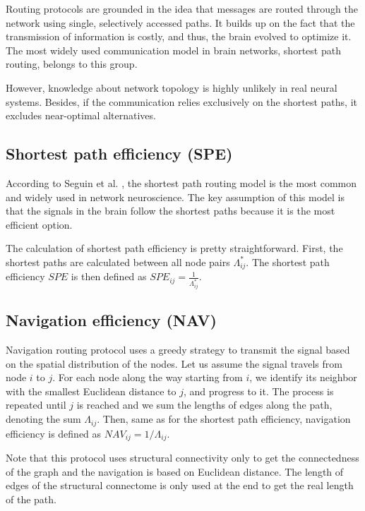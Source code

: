 Routing protocols are grounded in the idea that messages are routed through the network using single, selectively accessed paths. It builds up on the fact that the transmission of information is costly, and thus, the brain evolved to optimize it. The most widely used communication model in brain networks, shortest path routing, belongs to this group. \cite{seguin_brain_2023}

However, knowledge about network topology is highly unlikely in real neural systems. Besides, if the communication relies exclusively on the shortest paths, it excludes near-optimal alternatives. \cite{avena-koenigsberger_communication_2018}

\subsection{Shortest path efficiency (SPE)}

According to Seguin et al. \cite{seguin_brain_2023}, the shortest path routing model is the most common and widely used in network neuroscience. The key assumption of this model is that the signals in the brain follow the shortest paths because it is the most efficient option.

The calculation of shortest path efficiency is pretty straightforward. First, the shortest paths are calculated between all node pairs $\Lambda^*_{ij}$. The shortest path efficiency $SPE$ is then defined as $SPE_{ij}=\frac{1}{\Lambda^*_{ij}}$.

\subsection{Navigation efficiency (NAV)}

Navigation routing protocol uses a greedy strategy to transmit the signal  based on the spatial distribution of the nodes. Let us assume the signal travels from node $i$ to $j$. For each node along the way starting from $i$, we identify its neighbor with the smallest Euclidean distance to $j$, and progress to it. The process is repeated until $j$ is reached and we sum the lengths of edges along the path, denoting the sum $\Lambda_{ij}$. Then, same as for the shortest path efficiency, navigation efficiency is defined as $NAV_{ij}=1/\Lambda_{ij}$.

Note that this protocol uses structural connectivity only to get the connectedness of the graph and the navigation is based on Euclidean distance. The length of edges of the structural connectome is only used at the end to get the real length of the path.

